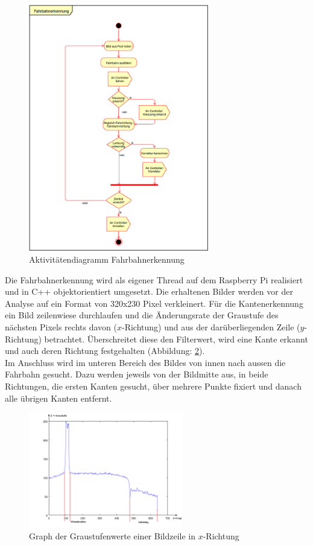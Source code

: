 \begin{figure}[H]%
\centering
\includegraphics[width=0.7\textwidth]{03_Loesungskonzept/pictures/Fahrbahnerkennung.png}
\caption{Aktivitätendiagramm Fahrbahnerkennung}
\label{fig:activityRoute}
\end{figure}
Die Fahrbahnerkennung wird als eigener Thread auf dem Raspberry Pi realisiert und in C++ objektorientiert umgesetzt. Die erhaltenen Bilder werden vor der Analyse auf ein Format von 320x230 Pixel verkleinert. Für die Kantenerkennung ein Bild zeilenwiese durchlaufen und die Änderungsrate der Graustufe des nächsten Pixels rechts davon ($x$-Richtung) und aus der darüberliegenden Zeile ($y$-Richtung) betrachtet. Überschreitet diese den Filterwert, wird eine Kante erkannt und auch deren Richtung festgehalten (Abbildung: \ref{fig:grayscale}).\\
Im Anschluss wird im unteren Bereich des Bildes von innen nach aussen die Fahrbahn gesucht. Dazu werden jeweils von der Bildmitte aus, in beide Richtungen, die ersten Kanten gesucht, über mehrere Punkte fixiert und danach alle übrigen Kanten entfernt.
\begin{figure}[H]%
\centering
\includegraphics[width=0.6\textwidth]{03_Loesungskonzept/pictures/graphPicture.png}
\caption{Graph der Graustufenwerte einer Bildzeile in $x$-Richtung}
\label{fig:grayscale}
\end{figure}
